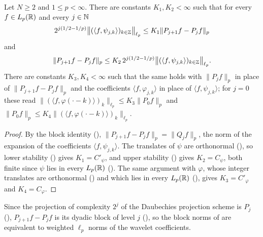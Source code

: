 \begin{proposition}
\label{prop:daub-block-norms}
\leanok
{}
Let $N \geq 2$ and $1 \leq p < \infty$. There are constants $K_1, K_2 < \infty$ such that for
every $f \in L_p(\mathbb{R})$ and every $j \in \mathbb{N}$
\[
  2^{j(1/2 - 1/p)} \bigl\|(\langle f, \psi_{j,k} \rangle)_{k \in \mathbb{Z}}\bigr\|_{\ell_p}
  \leq K_1 \|P_{j+1} f - P_j f\|_p
\]
and
\[
  \|P_{j+1} f - P_j f\|_p
  \leq K_2 \, 2^{j(1/2 - 1/p)} \bigl\|(\langle f, \psi_{j,k} \rangle)_{k \in \mathbb{Z}}\bigr\|_{\ell_p} .
\]
There are constants $K_3, K_4 < \infty$ such that the same holds with $\|P_j f\|_p$ in place of
$\|P_{j+1} f - P_j f\|_p$ and the coefficients $\langle f, \varphi_{j,k} \rangle$ in place of
$\langle f, \psi_{j,k} \rangle$; for $j = 0$ these read
$\|(\langle f, \varphi(\cdot - k) \rangle)_k\|_{\ell_p} \leq K_3 \|P_0 f\|_p$ and
$\|P_0 f\|_p \leq K_4 \|(\langle f, \varphi(\cdot - k) \rangle)_k\|_{\ell_p}$.
\end{proposition}

\begin{proof}
\leanok
{}
By the block identity (),
$\|P_{j+1} f - P_j f\|_p = \|Q_j f\|_p$, the norm of the expansion of the coefficients
$\langle f, \psi_{j,k} \rangle$. The translates of $\psi$ are orthonormal
(), so lower stability ()
gives $K_1 = C'_\psi$, and upper stability () gives
$K_2 = C_\psi$, both finite since $\psi$ lies in every $L_p(\mathbb{R})$
(). The same argument with $\varphi$, whose integer translates are
orthonormal () and which lies in every $L_p(\mathbb{R})$
(), gives $K_3 = C'_\varphi$ and $K_4 = C_\varphi$.
\end{proof}

Since the projection of complexity $2^j$ of the Daubechies projection scheme is $P_j$
(), $P_{j+1} f - P_j f$ is its dyadic block of level $j$
(), so the block norms of  are equivalent to weighted $\ell_p$
norms of the wavelet coefficients.

